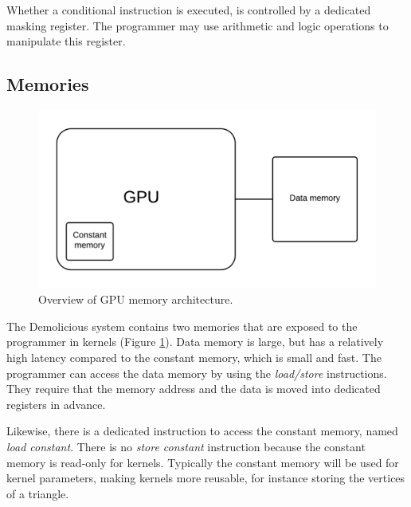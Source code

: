 Whether a conditional instruction is executed, is controlled by a dedicated masking register. 
The programmer may use arithmetic and logic operations to manipulate this register.

\subsection{Memories}

\begin{figure}[H]
	\centering
	\includegraphics[width=\textwidth]{system_overview/diagrams/memory_overview.png}
	\caption{Overview of GPU memory architecture.}
	\label{fig:memory_overview}
\end{figure}
The Demolicious system contains two memories that are exposed to the programmer in kernels (Figure \ref{fig:memory_overview}).
Data memory is large, but has a relatively high latency compared to the constant memory, which is small and fast.
The programmer can access the data memory by using the \textit{load/store} instructions.
They require that the memory address and the data is moved into dedicated registers in advance.

Likewise, there is a dedicated instruction to access the constant memory, named \textit{load constant}.
There is no \textit{store constant} instruction because the constant memory is read-only for kernels.
Typically the constant memory will be used for kernel parameters, making kernels more reusable,
for instance storing the vertices of a triangle.

